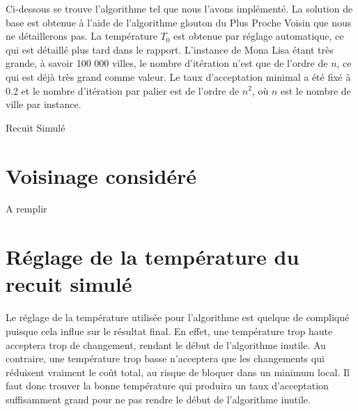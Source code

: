 \documentclass{article}
\begin{document}
Ci-dessous se trouve l'algorithme tel que nous l'avons implémenté.
La solution de base est obtenue à l'aide de l'algorithme glouton du Plus Proche Voisin que nous ne détaillerons pas.
La température $T_0$ est obtenue par réglage automatique, ce qui est détaillé plus tard dans le rapport.
L'instance de Mona Lisa étant très grande, à savoir 100 000 villes, le nombre d'itération n'est que de l'ordre de $n$, ce qui est déjà très grand comme valeur.
Le taux d'acceptation minimal a été fixé à 0.2 et le nombre d'itération par palier est de l'ordre de $n^2$, où $n$ est le nombre de ville par instance.

\begin{algorithm}[H]
	\SetAlgoLined
	\caption{Recuit Simulé}
\end{algorithm}


\section{Voisinage considéré}

A remplir

\section{Réglage de la température du recuit simulé}

Le réglage de la température utilisée pour l'algorithme est quelque de compliqué puisque cela influe sur le résultat final.
En effet, une température trop haute acceptera trop de changement, rendant le début de l'algorithme inutile.
Au contraire, une température trop basse n'acceptera que les changements qui réduisent vraiment le coût total, au risque de bloquer dans un minimum local.
Il faut donc trouver la bonne température qui produira un taux d'acceptation suffisamment grand pour ne pas rendre le début de l'algorithme inutile.
\end{document}
